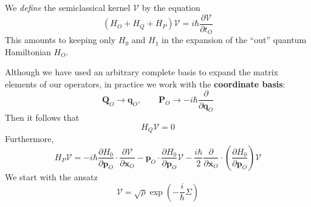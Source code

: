 We \textit{define} the semiclassical kernel $\mathcal{V}$ by the equation
\begin{equation}
	\left( H_{O} + H_{Q} + H_{P} \right) \mathcal{V} = i \hbar \frac{\partial \mathcal{V}}{\partial t_{O}} \label{SemiSchr}
\end{equation}
This amounts to keeping only $H_{0}$ and $H_{1}$ in the expansion of the ``out'' quantum Hamiltonian $H_{O}$.

Although we have used an arbitrary complete basis to expand the matrix elements of our operators, in practice we work with the \textbf{coordinate basis}:
\begin{equation}
	\mathbf{Q}_{O} \rightarrow \mathbf{q}_{O}, \qquad \mathbf{P}_{O} \rightarrow - i \hbar \frac{\partial}{\partial \mathbf{q}_{O}}
\end{equation}
Then it follows that
\begin{equation}
	H_{Q} \mathcal{V} = 0
\end{equation}
Furthermore,
\begin{equation}
	H_{P} \mathcal{V} = - i \hbar \frac{\partial H_{0}}{\partial \mathbf{p}_{O}} \cdot \frac{\partial \mathcal{V}}{\partial \mathbf{x}_{O}} - \mathbf{p}_{O} \cdot \frac{\partial H_{0}}{\partial \mathbf{p}_{O}} \mathcal{V} - \frac{i \hbar}{2} \frac{\partial}{\partial \mathbf{x}_{O}} \cdot \left( \frac{\partial H_{0}}{\partial \mathbf{p}_{O}} \right) \mathcal{V}
\end{equation}
We start with the ansatz
\begin{equation}
	\mathcal{V} = \sqrt{\rho} \exp{\left(- \frac{i}{\hbar} \Sigma \right)}
\end{equation}
